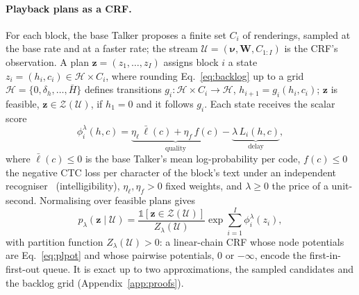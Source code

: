 \paragraph{Playback plans as a CRF.} For each block, the base Talker proposes a finite set $C_i$ of renderings, sampled
at the base rate and at a faster rate; the stream $\mathcal{U}=(\bm{\nu},\bm{W},C_{1:I})$ is the CRF's observation. A plan
$\bm{z}=(z_1,\dots,z_I)$ assigns block $i$ a state $z_i=(h_i,c_i)\in\mathcal{H}\times C_i$, where rounding
Eq.~\eqref{eq:backlog} up to a grid $\mathcal{H}=\{0,\delta_h,\dots,\bar H\}$ defines transitions
$g_i:\mathcal{H}\times C_i\to\mathcal{H}$, $h_{i+1}=g_i(h_i,c_i)$; $\bm{z}$ is feasible, $\bm{z}\in\mathcal{Z}(\mathcal{U})$,
if $h_1=0$ and it follows $g_i$. Each state receives the scalar score
\begin{equation}
\phi^\lambda_i(h,c)=\underbrace{\eta_\ell\,\bar\ell(c)+\eta_f\,f(c)}_{\text{quality}}-\underbrace{\lambda\,L_i(h,c)}_{\text{delay}},
\label{eq:plpot}
\end{equation}
where $\bar\ell(c)\le0$ is the base Talker's mean log-probability per code, $f(c)\le0$ the negative CTC loss per
character of the block's text under an independent recogniser~\citep{baevski2020wav2vec} (intelligibility),
$\eta_\ell,\eta_f>0$ fixed weights, and $\lambda\ge0$ the price of a unit-second. Normalising over feasible plans gives
\begin{equation}
p_\lambda(\bm{z}\mid\mathcal{U})=\frac{\mathds{1}[\bm{z}\in\mathcal{Z}(\mathcal{U})]}{Z_\lambda(\mathcal{U})}\exp\sum_{i=1}^{I}\phi^\lambda_i(z_i),
\label{eq:crf}
\end{equation}
with partition function $Z_\lambda(\mathcal{U})>0$: a linear-chain CRF whose node potentials are Eq.~\eqref{eq:plpot} and
whose pairwise potentials, $0$ or $-\infty$, encode the first-in-first-out queue. It is exact up to two approximations,
the sampled candidates and the backlog grid (Appendix~\ref{app:proofs}).

